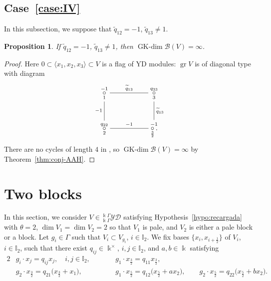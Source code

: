 \documentclass[pdftex]{sigma}
\numberwithin{equation}{section}
\newtheorem{Proposition}[Theorem]{Proposition}
 { \theoremstyle{definition}
\newtheorem{Definition}[Theorem]{Definition}
\newtheorem{Note}[Theorem]{Note}
\newtheorem{Example}[Theorem]{Example}
\newtheorem{Remark}[Theorem]{Remark} }
\newcommand{\GK}{\operatorname{GK-dim}}
\newcommand{\gr}{\operatorname{gr}}
\newcommand{\toba}{\mathscr B}
\newcommand{\I}{{\mathbb I}}
\newcommand{\yd}[1]{{}_{#1}^{#1}\mathcal{YD}}
\newcommand{\tresdos}{\frac{3}{2}}
\newcommand{\cincodos}{\frac{5}{2}}
\begin{document}
\subsection[Case (IV)]{Case~\ref{case:IV}}
In this subsection, we suppose that $\widetilde{q}_{12}=-1$, $\widetilde{q}_{13} \neq 1$.

\begin{Proposition}\label{prop:caseIV}
If $\widetilde{q}_{12}=-1$, $\widetilde{q}_{13} \neq 1$, then $\GK \toba(V)=\infty$.
\end{Proposition}

\begin{proof} Here $0 \subset \langle x_1, x_2, x_3\rangle \subset V$ is a flag of YD modules: $\gr V$ is of diagonal type with diagram
$$
\xymatrix{
\overset{-1}{\underset{1} {\circ}}\ar @{-}[d]_{-1} \ar @{-}[rr]^{\widetilde{q}_{13}} & & \overset{q_{33}} {\underset{3} {\circ}}\ar @{-}[d]^{\widetilde{q}_{13}} \\
\overset{q_{22}}{\underset{2} {\circ}} \ar @{-}[rr]^{-1} && \overset{-1}{\underset{\tresdos} {\circ}\,.} }
$$
There are no cycles of length $4$ in \cite[Table 3]{H-classif-RS}, so $\GK \toba(V) = \infty$ by Theorem~\ref{thm:conj-AAH}.
\end{proof}


\section{Two blocks}\label{sec:2blocks}
In this section, we consider $V\!\in \yd{\Bbbk\Gamma}$ satisfying Hypothesis~\ref{hypo:recargada}
with $\theta = 2$, ${\dim V_1= \dim V_2 = 2}$ so that $V_1$ is pale, and $V_2$ is either a pale block or a block.
Let $g_i\in\Gamma$ such that $V_i \subset V_{g_i}$, $i\in \I_2$.
We fix bases $\big\{x_i, x_{i+\frac{1}{2}}\big\}$ of $V_i$, $i\in \I_2$,
such that there exist $q_{ij} \in \Bbbk^{\times}$, $i,j\in \I_2$, and $a,b\in \Bbbk$ satisfying
\begin{alignat*}{2}
&g_i\cdot x_j = q_{ij}x_j, \quad i,j\in \I_2,\qquad&& g_1\cdot x_{\tresdos} = q_{11}x_{\tresdos},
\\
&g_2\cdot x_{\tresdos} = q_{21}\big(x_{\tresdos}+x_1\big),&&
g_1\cdot x_{\cincodos} = q_{12}\big(x_{\cincodos} + a x_{2}\big),\qquad
g_2\cdot x_{\cincodos} = q_{22}\big(x_{\cincodos} + b x_{2}\big).
\end{alignat*}
\end{document}

